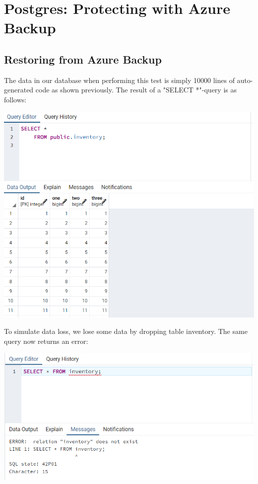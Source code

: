 \section{Postgres: Protecting with Azure Backup}
\label{app_pg_s1e2}



\subsection{Restoring from Azure Backup}
The data in our database when performing this test is simply 10000 lines of auto-generated code as shown previously. The result of a "SELECT *"-query is as follows:

\includegraphics[width=.9\linewidth]{figures/postgresaasmund/12.PNG}

To simulate data loss, we lose some data by dropping table inventory. The same query now returns an error:

\includegraphics[width=.9\linewidth]{figures/postgresaasmund/10.PNG}


